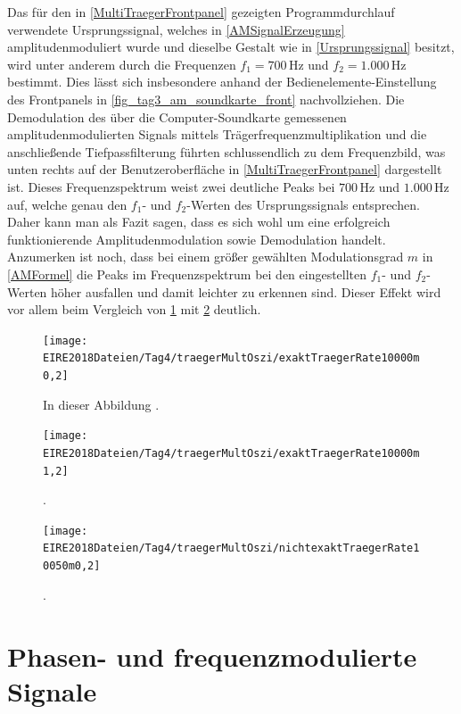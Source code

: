 \documentclass[
a4paper,
12pt,
pagesize,
ngerman
]{scrartcl}
\begin{document}
	Das für den in \cref{MultiTraegerFrontpanel} gezeigten Programmdurchlauf verwendete Ursprungssignal, welches in \cref{AMSignalErzeugung} amplitudenmoduliert wurde und dieselbe Gestalt wie in \cref{Ursprungssignal} besitzt, wird unter anderem durch die Frequenzen $f_1 = 700\,$Hz und $f_2 = 1.000\,$Hz bestimmt. 
	Dies lässt sich insbesondere anhand der Bedienelemente-Einstellung des Frontpanels in \cref{fig_tag3_am_soundkarte_front} nachvollziehen. 
	Die Demodulation des über die Computer-Soundkarte gemessenen amplitudenmodulierten Signals mittels Trägerfrequenzmultiplikation und die anschließende Tiefpassfilterung führten schlussendlich zu dem Frequenzbild, was unten rechts auf der Benutzeroberfläche in \cref{MultiTraegerFrontpanel} dargestellt ist. 
	Dieses Frequenzspektrum weist zwei deutliche Peaks bei $700\,$Hz und $1.000\,$Hz auf, welche genau den $f_1$- und $f_2$-Werten des Ursprungssignals entsprechen. 
	Daher kann man als Fazit sagen, dass es sich wohl um eine erfolgreich funktionierende Amplitudenmodulation sowie Demodulation handelt. 
	Anzumerken ist noch, dass bei einem größer gewählten Modulationsgrad $m$ in \cref{AMFormel} die Peaks im Frequenzspektrum bei den eingestellten $f_1$- und $f_2$-Werten höher ausfallen und damit leichter zu erkennen sind. Dieser Effekt wird vor allem beim Vergleich von \cref{AMDemodsuccm02} mit \cref{AMDemodsuccm12} deutlich.
	
	\begin{figure}[H]
		\centering
		\texttt{[image: EIRE2018Dateien/Tag4/traegerMultOszi/exaktTraegerRate10000m0,2]}
		\caption{In dieser Abbildung .}
		\label{AMDemodsuccm02}
	\end{figure}

	\noindent 

	\begin{figure}[H]
		\centering
		\texttt{[image: EIRE2018Dateien/Tag4/traegerMultOszi/exaktTraegerRate10000m1,2]}
		\caption{.}
		\label{AMDemodsuccm12}
	\end{figure}

	\noindent 

	\begin{figure}[H]
		\centering
		\texttt{[image: EIRE2018Dateien/Tag4/traegerMultOszi/nichtexaktTraegerRate10050m0,2]}
		\caption{.}
		\label{AMDemodfailm02}
	\end{figure}
	
	\section{Phasen- und frequenzmodulierte Signale}
\end{document}
